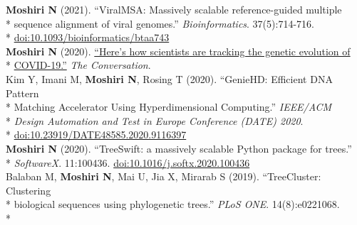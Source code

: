 \documentclass[margin,line]{res}
\begin{document}
\begin{resume}
\hspace*{4mm} \textbf{Moshiri N} (2021). ``ViralMSA: Massively scalable reference-guided multiple\\*
\hspace*{9mm} sequence alignment of viral genomes.'' \textit{Bioinformatics}. 37(5):714-716.\\*\vspace{2mm}
\hspace*{8mm} \href{https://doi.org/10.1093/bioinformatics/btaa743}{doi:10.1093/bioinformatics/btaa743}\\
\hspace*{4mm} \textbf{Moshiri N} (2020). \href{https://theconversation.com/heres-how-scientists-are-tracking-the-genetic-evolution-of-covid-19-134201}{``Here's how scientists are tracking the genetic evolution of}\\*\vspace{2mm}
\hspace*{8mm} \href{https://theconversation.com/heres-how-scientists-are-tracking-the-genetic-evolution-of-covid-19-134201}{COVID-19.''} \textit{The Conversation}.\\
\hspace*{4mm} Kim Y, Imani M, \textbf{Moshiri N}, Rosing T (2020). ``GenieHD: Efficient DNA Pattern\\*
\hspace*{9mm}  Matching Accelerator Using Hyperdimensional Computing.'' \textit{IEEE/ACM}\\*
\hspace*{9mm} \textit{Design Automation and Test in Europe Conference (DATE) 2020}.\\*\vspace{2mm}
\hspace*{8mm} \href{https://doi.org/10.23919/DATE48585.2020.9116397}{doi:10.23919/DATE48585.2020.9116397}\\
\hspace*{4mm} \textbf{Moshiri N} (2020). ``TreeSwift: a massively scalable Python package for trees.''\\*\vspace{2mm}
\hspace*{8mm} \textit{SoftwareX}. 11:100436. \href{https://doi.org/10.1016/j.softx.2020.100436}{doi:10.1016/j.softx.2020.100436}\\
\hspace*{4mm} Balaban M, \textbf{Moshiri N}, Mai U, Jia X, Mirarab S (2019). ``TreeCluster: Clustering\\*
\hspace*{9mm} biological sequences using phylogenetic trees.'' \textit{PLoS ONE}. 14(8):e0221068.\\*\vspace{2mm}

\end{resume}
\end{document}
